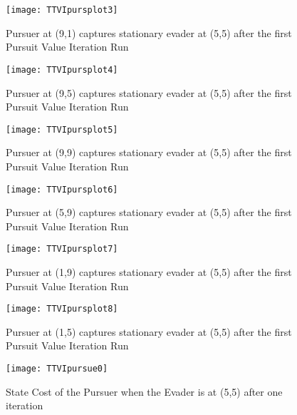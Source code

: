 \begin{figure}
\vspace{2.4in}
\centering
\texttt{[image: TTVIpursplot3]}
\caption{Pursuer at (9,1) captures stationary evader at (5,5) after the first Pursuit Value Iteration Run}
\label{TTVIpursplot3}
\end{figure}
\clearpage
\newpage

\begin{figure}
\vspace{2.4in}
\centering
\texttt{[image: TTVIpursplot4]}
\caption{Pursuer at (9,5) captures stationary evader at (5,5) after the first Pursuit Value Iteration Run}
\label{TTVIpursplot4}
\end{figure}
\clearpage
\newpage

\begin{figure}
\vspace{2.4in}
\centering
\texttt{[image: TTVIpursplot5]}
\caption{Pursuer at (9,9) captures stationary evader at (5,5) after the first Pursuit Value Iteration Run}
\label{TTVIpursplot5}
\end{figure}
\clearpage
\newpage

\begin{figure}
\vspace{2.4in}
\centering
\texttt{[image: TTVIpursplot6]}
\caption{Pursuer at (5,9) captures stationary evader at (5,5) after the first Pursuit Value Iteration Run}
\label{TTVIpursplot6}
\end{figure}
\clearpage
\newpage

\begin{figure}
\vspace{2.4in}
\centering
\texttt{[image: TTVIpursplot7]}
\caption{Pursuer at (1,9) captures stationary evader at (5,5) after the first Pursuit Value Iteration Run}
\label{TTVIpursplot7}
\end{figure}
\clearpage
\newpage

\begin{figure}
\vspace{2.4in}
\centering
\texttt{[image: TTVIpursplot8]}
\caption{Pursuer at (1,5) captures stationary evader at (5,5) after the first Pursuit Value Iteration Run}
\label{TTVIpursplot8}
\end{figure}
\clearpage
\newpage

\begin{figure}
\vspace{2.4in}
\centering
\texttt{[image: TTVIpursue0]}
\caption{State Cost of the Pursuer when the Evader is at (5,5) after one iteration}
\label{TTVIpursue0}
\end{figure}
\clearpage
\newpage

